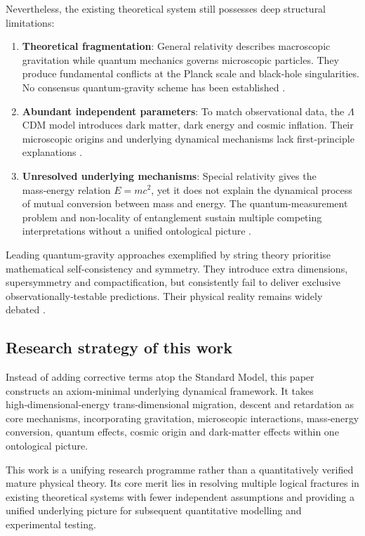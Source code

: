\documentclass[12pt,a4paper]{article}
\begin{document}
Nevertheless, the existing theoretical system still possesses deep structural limitations:
\begin{enumerate}
\item \textbf{Theoretical fragmentation}: General relativity describes macroscopic gravitation while quantum mechanics governs microscopic particles. They produce fundamental conflicts at the Planck scale and black‑hole singularities. No consensus quantum‑gravity scheme has been established \cite{weinberg1972,rovelli2004}.
\item \textbf{Abundant independent parameters}: To match observational data, the $\Lambda$CDM model introduces dark matter, dark energy and cosmic inflation. Their microscopic origins and underlying dynamical mechanisms lack first‑principle explanations \cite{peebles1993}.
\item \textbf{Unresolved underlying mechanisms}: Special relativity gives the mass‑energy relation $E=mc^2$, yet it does not explain the dynamical process of mutual conversion between mass and energy. The quantum‑measurement problem and non‑locality of entanglement sustain multiple competing interpretations without a unified ontological picture \cite{bell1964,zeilinger2010}.
\end{enumerate}

Leading quantum‑gravity approaches exemplified by string theory prioritise mathematical self‑consistency and symmetry. They introduce extra dimensions, supersymmetry and compactification, but consistently fail to deliver exclusive observationally‑testable predictions. Their physical reality remains widely debated \cite{smolin2006,witten1996}.

\subsection{Research strategy of this work}
Instead of adding corrective terms atop the Standard Model, this paper constructs an axiom‑minimal underlying dynamical framework. It takes high‑dimensional‑energy trans‑dimensional migration, descent and retardation as core mechanisms, incorporating gravitation, microscopic interactions, mass‑energy conversion, quantum effects, cosmic origin and dark‑matter effects within one ontological picture.

This work is a unifying research programme rather than a quantitatively verified mature physical theory. Its core merit lies in resolving multiple logical fractures in existing theoretical systems with fewer independent assumptions and providing a unified underlying picture for subsequent quantitative modelling and experimental testing.
\end{document}
